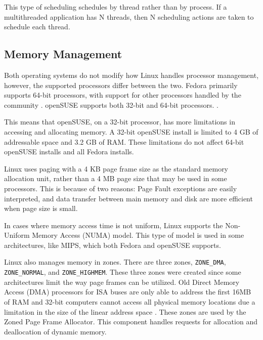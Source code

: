 \documentclass{article}
\begin{document}
This type of scheduling schedules by thread rather than by process. If a
multithreaded application has N threads, then N scheduling actions are taken to
schedule each thread. \parencite{kalin_2019}

\subsection{Memory Management}
Both operating systems do not modify how Linux handles processor management,
however, the supported processors differ between the two. Fedora primarily
supports 64-bit processors, with support for other processors handled by the
community \parencite{fedora_arch}. openSUSE supports both 32-bit and 64-bit
processors. \parencite{opensuse_arch}.

This means that openSUSE, on a 32-bit processor, has more limitations in
accessing and allocating memory. A 32-bit openSUSE install is limited to 4 GB of
addressable space and 3.2 GB of RAM. These limitations do not affect 64-bit
openSUSE installs and all Fedora installs. \parencite{guru99}

Linux uses paging with a 4 KB page frame size as the standard memory allocation
unit, rather than a 4 MB page size that may be used in some processors. This is
because of two reasons: Page Fault exceptions are easily interpreted, and data
transfer between main memory and disk are more efficient when page size is
small. \parencite[294-295]{linux}

In cases where memory access time is not uniform, Linux supports the Non-Uniform
Memory Access (NUMA) model. This type of model is used in some architectures,
like MIPS, which both Fedora and openSUSE supports. \parencite[297-298]{linux}

Linux also manages memory in zones. There are three zones, \texttt{ZONE\_DMA},
\texttt{ZONE\_NORMAL}, and \texttt{ZONE\_HIGHMEM}. These three zones were
created since some architectures limit the way page frames can be utilized. Old
Direct Memory Access (DMA) processors for ISA buses are only able to address the
first 16MB of RAM and 32-bit computers cannot access all physical memory
locations due a limitation in the size of the linear address space
\parencite[299]{linux}. These zones are used by the Zoned Page Frame Allocator.
This component handles requests for allocation and deallocation of dynamic
memory. \parencite[302]{linux}
\end{document}
